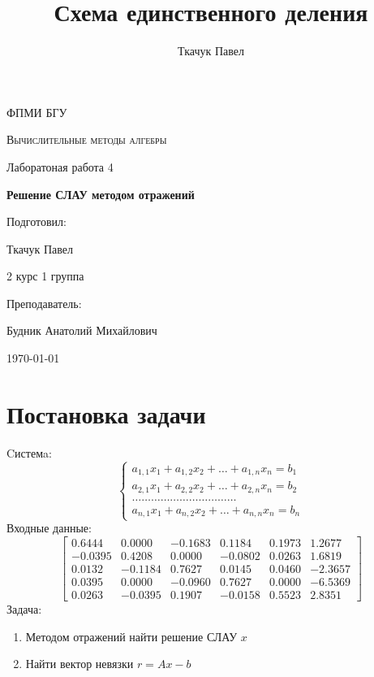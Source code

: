 \documentclass[11.4pt]{article}
\author{Ткачук Павел}
\title{Схема единственного деления}
\begin{document}
	\begin{titlepage}
		
		\centering
		{\scshape\LARGE ФПМИ БГУ \par}
		\vfill
		\begin{flushleft}
		{\scshape\Large Вычислительные методы алгебры\par Лаборатоная работа 4 \par}
		\vspace{1cm}
		{\huge\bfseries Решение СЛАУ методом отражений\par}
		\end{flushleft}
		\vspace{10cm}
		\begin{flushright}
		\large
		Подготовил:\par
		Ткачук Павел\par
		2 курс 1 группа\par
		\vspace{0.5cm}
		Преподаватель:\par
		Будник Анатолий Михайлович
		\end{flushright}
		
		\vfill
		{\large \today}
	\end{titlepage}
\section{Постановка задачи}
	Cистемa:
	\begin{equation}
		\left\{
			\begin{array}{c}
				a_{1,1} x_1 + a_{1,2} x_2 + \ldots + a_{1,n} x_n = b_1  \\
				a_{2,1} x_1 + a_{2,2} x_2 + \ldots + a_{2,n} x_n = b_2  \\
				\dots\dots\dots\dots\dots\dots\dots\dots\dots\dots\dots  \\
				a_{n,1} x_1 + a_{n,2} x_2 + \ldots + a_{n,n} x_n = b_n  
			\end{array}
		\right.
	\end{equation}
	Входные данные:
	\[
		\left[
			\begin{array}{ccccc|c}
				0.6444 & 0.0000 & -0.1683 & 0.1184 & 0.1973 & 1.2677\\
				-0.0395 & 0.4208 & 0.0000 & -0.0802 & 0.0263 & 1.6819\\
				0.0132  & -0.1184 & 0.7627 & 0.0145 & 0.0460 & -2.3657\\
				0.0395 & 0.0000 & -0.0960 & 0.7627 & 0.0000 & -6.5369\\
				0.0263 & -0.0395 & 0.1907 & -0.0158 & 0.5523 & 2.8351
			\end{array}
		\right]
	\]
	Задача:
	\begin{enumerate}
		\item Методом отражений найти решение СЛАУ $x$
		\item Найти вектор невязки $r = Ax-b$
	\end{enumerate}
\end{document}
